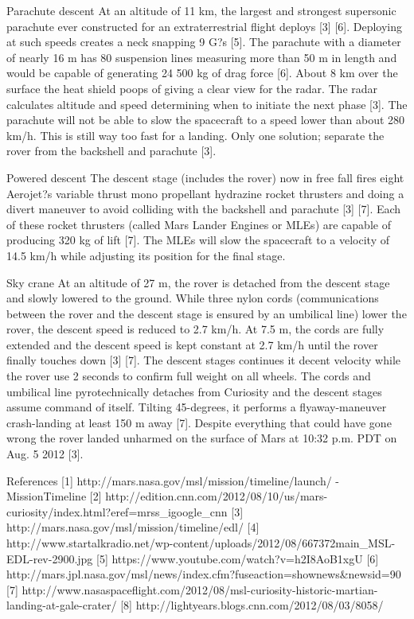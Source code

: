 Parachute descent
At an altitude of 11 km, the largest and strongest supersonic parachute ever constructed for an extraterrestrial flight deploys [3] [6]. Deploying at such speeds creates a neck snapping 9 G?s [5]. The parachute with a diameter of nearly 16 m has 80 suspension lines measuring more than 50 m in length and would be capable of generating 24 500 kg of drag force [6]. About 8 km over the surface the heat shield poops of giving a clear view for the radar. The radar calculates altitude and speed determining when to initiate the next phase [3].
The parachute will not be able to slow the spacecraft to a speed lower than about 280 km/h. This is still way too fast for a landing. Only one solution; separate the rover from the backshell and parachute [3].

Powered descent
The descent stage (includes the rover) now in free fall fires eight Aerojet?s variable thrust mono propellant hydrazine rocket thrusters and doing a divert maneuver to avoid colliding with the backshell and parachute [3] [7]. Each of these rocket thrusters (called Mars Lander Engines or MLEs) are capable of producing 320 kg of lift [7]. The MLEs will slow the spacecraft to a velocity of 14.5 km/h while adjusting its position for the final stage. 

Sky crane
At an altitude of 27 m, the rover is detached from the descent stage and slowly lowered to the ground. While three nylon cords (communications between the rover and the descent stage is ensured by an umbilical line) lower the rover, the descent speed is reduced to 2.7 km/h. At 7.5 m, the cords are fully extended and the descent speed is kept constant at 2.7 km/h until the rover finally touches down [3] [7]. The descent stages continues it decent velocity while the rover use 2 seconds to confirm full weight on all wheels. The cords and umbilical line pyrotechnically detaches from Curiosity and the descent stages assume command of itself. Tilting 45-degrees, it performs a flyaway-maneuver crash-landing at least 150 m away [7]. 
Despite everything that could have gone wrong the rover landed unharmed on the surface of Mars at 10:32 p.m. PDT on Aug. 5 2012 [3].


References
[1]	http://mars.nasa.gov/msl/mission/timeline/launch/ - MissionTimeline
[2]	http://edition.cnn.com/2012/08/10/us/mars-curiosity/index.html?eref=mrss_igoogle_cnn
[3]	http://mars.nasa.gov/msl/mission/timeline/edl/
[4]	http://www.startalkradio.net/wp-content/uploads/2012/08/667372main_MSL-EDL-rev-2900.jpg
[5]	https://www.youtube.com/watch?v=h2I8AoB1xgU
[6]	http://mars.jpl.nasa.gov/msl/news/index.cfm?fuseaction=shownews&newsid=90
[7]	http://www.nasaspaceflight.com/2012/08/msl-curiosity-historic-martian-landing-at-gale-crater/
[8]	http://lightyears.blogs.cnn.com/2012/08/03/8058/